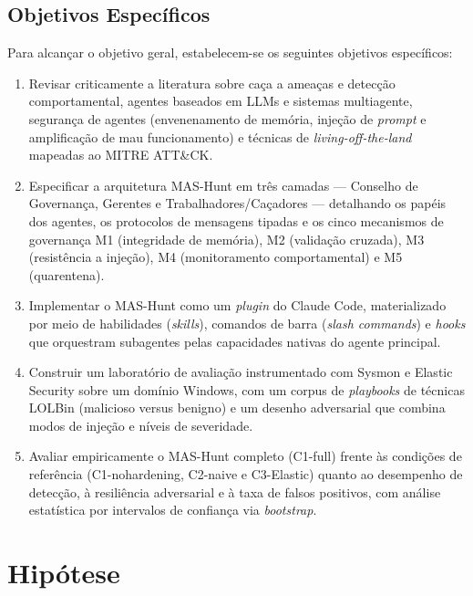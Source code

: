 \subsection{Objetivos Específicos}
\label{subsec:objetivos-especificos}

Para alcançar o objetivo geral, estabelecem-se os seguintes objetivos
específicos:

\begin{enumerate}
  \item Revisar criticamente a literatura sobre caça a ameaças e detecção
  comportamental, agentes baseados em LLMs e sistemas multiagente, segurança de
  agentes (envenenamento de memória, injeção de \emph{prompt} e amplificação de
  mau funcionamento) e técnicas de \emph{living-off-the-land} mapeadas ao MITRE
  ATT\&CK.

  \item Especificar a arquitetura MAS-Hunt em três camadas — Conselho de
  Governança, Gerentes e Trabalhadores/Caçadores — detalhando os papéis dos
  agentes, os protocolos de mensagens tipadas e os cinco mecanismos de
  governança M1 (integridade de memória), M2 (validação cruzada), M3
  (resistência a injeção), M4 (monitoramento comportamental) e M5 (quarentena).

  \item Implementar o MAS-Hunt como um \emph{plugin} do Claude Code, materializado
  por meio de habilidades (\emph{skills}), comandos de barra (\emph{slash
  commands}) e \emph{hooks} que orquestram subagentes pelas capacidades nativas
  do agente principal.

  \item Construir um laboratório de avaliação instrumentado com Sysmon e Elastic
  Security sobre um domínio Windows, com um corpus de \emph{playbooks} de
  técnicas LOLBin (malicioso versus benigno) e um desenho adversarial que combina
  modos de injeção e níveis de severidade.

  \item Avaliar empiricamente o MAS-Hunt completo (C1-full) frente às condições de
  referência (C1-nohardening, C2-naive e C3-Elastic) quanto ao desempenho de
  detecção, à resiliência adversarial e à taxa de falsos positivos, com análise
  estatística por intervalos de confiança via \emph{bootstrap}.
\end{enumerate}

\section{Hipótese}
\label{sec:hipotese}

